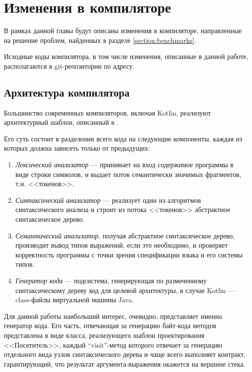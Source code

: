 \newpage
\section{Изменения в компиляторе}
В рамках данной главы будут описаны изменения в компиляторе, направленные на решение проблем,
найденных в разделе \ref{section:benchmarks}.

Исходные коды компилятора, в том числе изменения, описанные в данной работе, располагаются в
git-репозитории по адресу\cite{Kotlin}.

\subsection{Архитектура компилятора}
Большинство современных компиляторов, включая Kotlin, реализуют архитектурный шаблон, описанный
в \cite{Muchnick}.

Его суть состоит в разделении всего кода на следующие компоненты, каждая из которых должна зависеть
только от предыдущих:
\begin{enumerate}
    \item \textit{Лексический анализатор} --- принимает на вход содержимое программы в виде строки
    символов, и выдает поток семантически значимых фрагментов, т.н. <<токенов>>.

    \item \textit{Синтаксический анализатор} --- реализует один из алгоритмов синтаксического
    анализа и строит из потока <<токенов>> абстрактное синтаксическое дерево.

    \item \textit{Семантический анализатор}, получая абстрактное синтаксическое дерево, производит
    вывод типов выражений, если это необходимо, и проверяет корректность программы с точки зрения
    спецификации языка и его системы типов.

    \item \textit{Генератор кода} --- подсистема, генерирующая по размеченному синтаксическому
    дереву код для целевой архитектуры, в случае Kotlin --- class-файлы виртуальной машины Java.
\end{enumerate}

Для данной работы наибольший интерес, очевидно, представляет именно генератор кода.
Его часть, отвечающая за генерацию байт-кода методов представлена в виде класса, реализующего
шаблон проектирования <<Посетитель>>\cite{Gamma}, каждый ``visit''-метод которого отвечает за
генерацию отдельного вида узлов синтаксического дерева и чаще всего выполняет контракт,
гарантирующий, что результат аргумента-выражения окажется на вершине стека.

